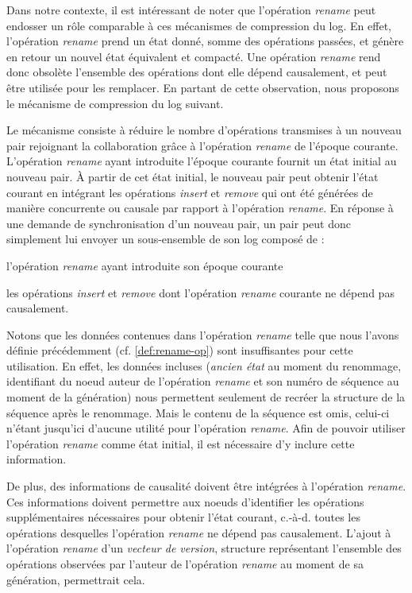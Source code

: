 \documentclass[12pt]{thesul}
\newcommand{\ie}{c.-à-d. }
\begin{document}
Dans notre contexte, il est intéressant de noter que l'opération \emph{rename} peut endosser un rôle comparable à ces mécanismes de compression du log.
En effet, l'opération \emph{rename} prend un état donné, somme des opérations passées, et génère en retour un nouvel état équivalent et compacté.
Une opération \emph{rename} rend donc obsolète l'ensemble des opérations dont elle dépend causalement, et peut être utilisée pour les remplacer.
En partant de cette observation, nous proposons le mécanisme de compression du log suivant.

Le mécanisme consiste à réduire le nombre d'opérations transmises à un nouveau pair rejoignant la collaboration grâce à l'opération \emph{rename} de l'époque courante.
L'opération \emph{rename} ayant introduite l'époque courante fournit un état initial au nouveau pair.
À partir de cet état initial, le nouveau pair peut obtenir l'état courant en intégrant les opérations \emph{insert} et \emph{remove} qui ont été générées de manière concurrente ou causale par rapport à l'opération \emph{rename}.
En réponse à une demande de synchronisation d'un nouveau pair, un pair peut donc simplement lui envoyer un sous-ensemble de son log composé de :
\begin{enumerate*}[label=(\roman*)]
  \item l'opération \emph{rename} ayant introduite son époque courante
  \item les opérations \emph{insert} et \emph{remove} dont l'opération \emph{rename} courante ne dépend pas causalement.
\end{enumerate*}

Notons que les données contenues dans l'opération \emph{rename} telle que nous l'avons définie précédemment (cf. \autoref{def:rename-op}) sont insuffisantes pour cette utilisation.
En effet, les données incluses (\emph{ancien état} au moment du renommage, identifiant du noeud auteur de l'opération \emph{rename} et son numéro de séquence au moment de la génération) nous permettent seulement de recréer la structure de la séquence après le renommage.
Mais le contenu de la séquence est omis, celui-ci n'étant jusqu'ici d'aucune utilité pour l'opération \emph{rename}.
Afin de pouvoir utiliser l'opération \emph{rename} comme état initial, il est nécessaire d'y inclure cette information.

De plus, des informations de causalité doivent être intégrées à l'opération \emph{rename}.
Ces informations doivent permettre aux noeuds d'identifier les opérations supplémentaires nécessaires pour obtenir l'état courant, \ie toutes les opérations desquelles l'opération \emph{rename} ne dépend pas causalement.
L'ajout à l'opération \emph{rename} d'un \emph{vecteur de version}, structure représentant l'ensemble des opérations observées par l'auteur de l'opération \emph{rename} au moment de sa génération, permettrait cela.
\end{document}
